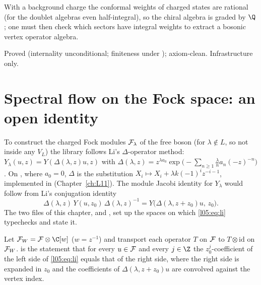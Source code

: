 \begin{physics}
With a background charge the conformal weights of charged states are rational (for the doublet algebras even
half-integral), so the chiral algebra is graded by $\Q$; one must then check which sectors have integral weights to
extract a bosonic vertex operator algebra.
\end{physics}

\begin{status}
Proved (internality unconditional; finiteness under ); axiom-clean. Infrastructure only.
\end{status}

\section{Spectral flow on the Fock space: an open identity}\label{l05:sec:li}

To construct the charged Fock modules $\mathcal{F}_\lambda$ of the free boson (for $\lambda\notin L$, so not inside any $V_L$) the
library follows Li's $\Delta$-operator method: $Y_\lambda(u,z)=Y(\Delta(\lambda,z)u,z)$ with
$\Delta(\lambda,z)=z^{\lambda a_0}\exp\big(-\sum_{n\ge1}\frac{\lambda}{n}a_n(-z)^{-n}\big)$. On , where $a_0=0$, $\Delta$ is the
substitution $X_i\mapsto X_i+\lambda k(-1)^iz^{-i-1}$, implemented in 
(Chapter~\ref{ch:L11}). The module Jacobi identity for $Y_\lambda$ would follow from Li's conjugation identity
\begin{equation}\label{l05:eq:li}
 \Delta(\lambda,z)\,Y(u,z_0)\,\Delta(\lambda,z)^{-1}=Y\big(\Delta(\lambda,z+z_0)u,\,z_0\big).
\end{equation}
The two files of this chapter,  and , set up the spaces on which
\eqref{l05:eq:li} typechecks and state it.

\begin{definition}\label{l05:def:li}
Let $\lfiveF_W=\lfiveF\otimes\C[w]$ ($w=z^{-1}$) and transport each operator $T$ on $\mathcal{F}$ to $T\otimes\mathrm{id}$ on
$\mathcal{F}_W$.  is the statement that for every $u\in\mathcal{F}$ and every $j\in\Z$ the $z_0^j$-coefficient of
the left side of \eqref{l05:eq:li} equals that of the right side, where the right side is expanded in $z_0$ and the
coefficients of $\Delta(\lambda,z+z_0)u$ are convolved against the vertex index.
\end{definition}


